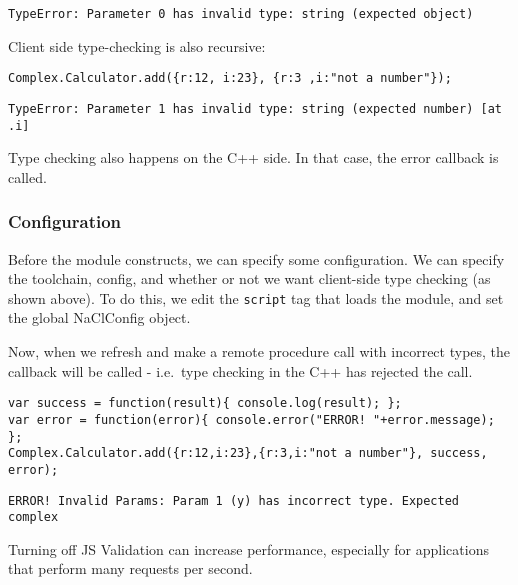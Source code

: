 \begin{verbatim}
TypeError: Parameter 0 has invalid type: string (expected object)
\end{verbatim}

Client side type-checking is also recursive:

\begin{verbatim}
Complex.Calculator.add({r:12, i:23}, {r:3 ,i:"not a number"});
\end{verbatim}

\begin{verbatim}
TypeError: Parameter 1 has invalid type: string (expected number) [at .i]
\end{verbatim}

Type checking also happens on the C++ side. In that case, the error
callback is called.

\subsubsection{Configuration}\label{configuration}

Before the module constructs, we can specify some configuration. We can
specify the toolchain, config, and whether or not we want client-side
type checking (as shown above). To do this, we edit the \texttt{script}
tag that loads the module, and set the global NaClConfig object.

\begin{Shaded}
\begin{Highlighting}[]
 \NormalTok{= \{}
  \NormalTok{: } 
\NormalTok{\};}
\NormalTok{\});}
\end{Highlighting}
\end{Shaded}

Now, when we refresh and make a remote procedure call with incorrect
types, the callback will be called - i.e.~type checking in the C++ has
rejected the call.

\begin{verbatim}
var success = function(result){ console.log(result); };
var error = function(error){ console.error("ERROR! "+error.message); };
Complex.Calculator.add({r:12,i:23},{r:3,i:"not a number"}, success, error);
\end{verbatim}

\begin{verbatim}
ERROR! Invalid Params: Param 1 (y) has incorrect type. Expected complex
\end{verbatim}

Turning off JS Validation can increase performance, especially for
applications that perform many requests per second.
